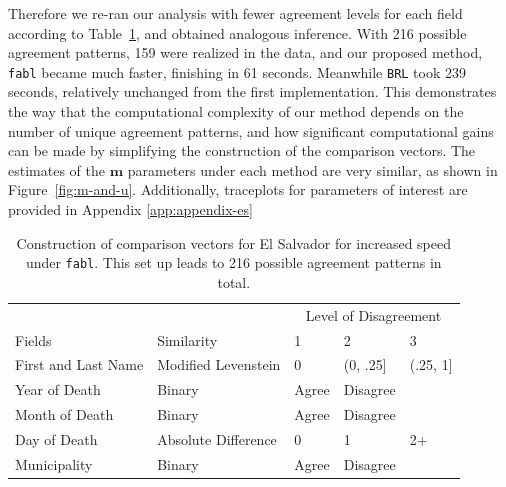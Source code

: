 \documentclass[12pt,letterpaper]{article}
\newcommand{\1}[1]{\mathbb{I}\!\left[#1\right]} %
\begin{document}
Therefore we re-ran our analysis with fewer agreement levels for each field according to Table~\ref{Tab:el_salvador_cutoffs_2}, and obtained analogous inference. With 216 possible agreement patterns, 159 were realized in the data, and our proposed method, \texttt{fabl} became much faster, finishing in 61 seconds. Meanwhile \texttt{BRL} took 239 seconds, relatively unchanged from the first implementation. This demonstrates the way that the computational complexity of our method depends on the number of unique agreement patterns, and how significant computational gains can be made by simplifying the construction of the comparison vectors. The estimates of the \(\bm{m}\) parameters under each method are very similar, as shown in Figure~\ref{fig:m-and-u}. Additionally, traceplots for parameters of interest are provided in Appendix \ref{app:appendix-es}

\begin{table}
	\centering
	\begin{tabular}[h!]{ll|lll}
		\hline
		\multicolumn{2}{c|}{ } & \multicolumn{3}{c}{Level of Disagreement} \\
		\cline{3-5}
		Fields & Similarity & 1 & 2 & 3\\
		\hline
		First and Last Name & Modified Levenstein & 0 & (0, .25] & (.25, 1]\\
		Year of Death & Binary & Agree & Disagree & \\
		Month of Death & Binary & Agree & Disagree & \\
		Day of Death & Absolute Difference & 0 & 1 & 2+\\
		Municipality & Binary & Agree & Disagree & \\
		\hline
	\end{tabular}
	\caption{Construction of comparison vectors for El Salvador for increased speed under \texttt{fabl}. This set up leads to 216 possible agreement patterns in total.}\label{Tab:el_salvador_cutoffs_2}
\end{table}
\end{document}

